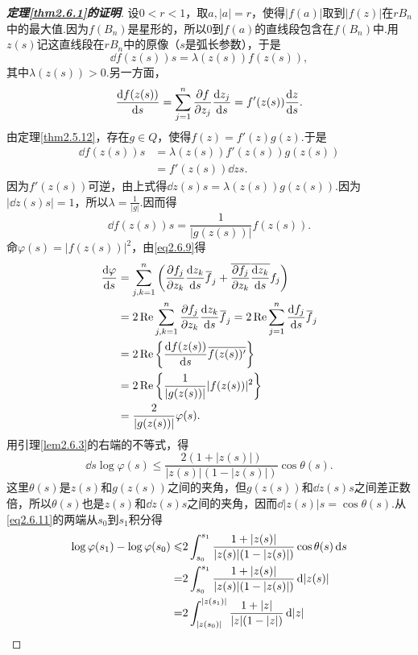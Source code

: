 \begin{proof}[\textbf{定理\ref{thm2.6.1}的证明}]
	设$0<r<1$，取$a,|a|=r$，使得$|f(a)|$取到$|f(z)|$在$rB_n$中的最大值.因为$f(B_n)$是星形的，所以$0$到$f(a)$的直线段包含在$f(B_n)$中.用$z(s)$记这直线段在$rB_n$中的原像（$s$是弧长参数），于是
	\[\dd{f(z(s))}{s}=\lambda(z(s))f(z(s)),\]
	其中$\lambda(z(s))>0$.另一方面，
	\[\frac{\mathop{}\!\mathrm df(z(s))}{\mathop{}\!\mathrm ds}=\sum_{j=1}^{n}\frac{\partial f}{\partial z_j}\frac{\mathop{}\!\mathrm dz_j}{\mathop{}\!\mathrm ds}=f'(z(s))\frac{\mathop{}\!\mathrm dz}{\mathop{}\!\mathrm ds}.\]
	由定理\ref{thm2.5.12}，存在$g\in Q$，使得$f(z)=f'(z)g(z)$.于是
	\begin{align*}
		\dd{f(z(s))}{s}
		&=\lambda(z(s))f'(z(s))g(z(s))\\
		&=f'(z(s))\dd{z}{s}.
	\end{align*}
因为$f'(z(s))$可逆，由上式得$\dd{z(s)}{s}=\lambda(z(s))g(z(s))$.因为$\left|\dd{z(s)}{s}\right|=1$，所以$\lambda=\frac1{|g|}$.因而得
\begin{equation}\label{eq2.6.9}
	\dd{f(z(s))}{s}=\frac1{|g(z(s))|}f(z(s)).
\end{equation}
命$\varphi(s)=|f(z(s))|^2$，由\eqref{eq2.6.9}得
\begin{align}\label{eq2.6.10}
	\dd{\varphi}{s}
	&=\sum_{j,k=1}^{n}\left(\pp{f_j}{z_k}\dd{z_k}{s}\bar{f}_j+\bar{\pp{f_j}{z_k}}\bar{\dd{z_k}{s}}f_j\right)\notag\\
	&=2\Re\sum_{j,k=1}^{n}\pp{f_j}{z_k}\dd{z_k}{s}\bar{f}_j=2\Re\sum_{j=1}^{n}\dd{f_j}{s}\bar{f}_j\notag\\
	&=2\Re\left\{\dd{f(z(s))}{s}\bar{f(z(s))'}\right\}\notag\\
	&=2\Re\left\{\frac1{|g(z(s))|}|f(z(s))|^2\right\}\notag\\
	&=\frac2{|g(z(s))|}\varphi(s).
\end{align}
用引理\ref{lem2.6.3}的右端的不等式，得
\begin{equation}\label{eq2.6.11}
	\dd{}{s}\log\varphi(s)\le\frac{2(1+|z(s)|)}{|z(s)|(1-|z(s)|)}\cos\theta(s).
\end{equation}
这里$\theta(s)$是$z(s)$和$g(z(s))$之间的夹角，但$g(z(s))$和$\dd{z(s)}{s}$之间差正数倍，所以$\theta(s)$也是$z(s)$和$\dd{z(s)}{s}$之间的夹角，因而$\dd{|z(s)|}{s}=\cos\theta(s)$.从\eqref{eq2.6.11}的两端从$s_0$到$s_1$积分得
\begin{align}\label{eq2.6.12}
	\log\varphi(s_1)-\log\varphi(s_0)
	\le&2\int_{s_0}^{s_1}\frac{1+|z(s)|}{|z(s)|(1-|z(s)|)}\cos\theta(s)\dif s\notag\\
	=&2\int_{s_0}^{s_1}\frac{1+|z(s)|}{|z(s)|(1-|z(s)|)}\dif |z(s)|\notag\\
	=&2\int_{|z(s_0)|}^{|z(s_1)|}\frac{1+|z|}{|z|(1-|z|)}\dif|z|\notag\\

\end{align}
\end{proof}
